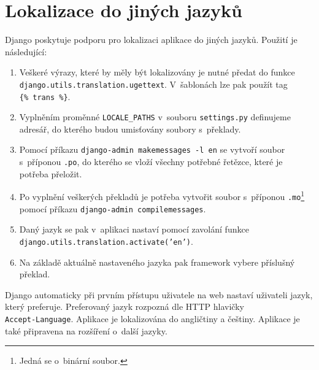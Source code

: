 \section{Lokalizace do jiných jazyků}
Django poskytuje podporu pro lokalizaci aplikace do jiných jazyků. Použití je následující:
\begin{enumerate}
    \item Veškeré výrazy, které by měly být lokalizovány je nutné předat do funkce \\\texttt{django.utils.translation.ugettext}. V~šablonách lze pak použít tag \\\mbox{\texttt{\{\% trans \%\}}}.
    \item Vyplněním proměnné \texttt{LOCALE\_PATHS} v~souboru \texttt{settings.py} definujeme adresář, do kterého budou umisťovány soubory s~překlady.
    \item Pomocí příkazu \texttt{django-admin makemessages -l en} se vytvoří soubor s~příponou \texttt{.po}, do kterého se vloží všechny potřebné řetězce, které je potřeba přeložit.
    \item Po vyplnění veškerých překladů je potřeba vytvořit soubor s~příponou \texttt{.mo}\footnote{Jedná se o~binární soubor.} pomocí příkazu \texttt{django-admin compilemessages}.
    \item Daný jazyk se pak v~aplikaci nastaví pomocí zavolání funkce \\\texttt{django.utils.translation.activate('en')}.
    \item Na základě aktuálně nastaveného jazyka pak framework vybere příslušný překlad.
\end{enumerate}

Django automaticky při prvním přístupu uživatele na web nastaví uživateli jazyk, který preferuje. Preferovaný jazyk rozpozná dle HTTP hlavičky \\\texttt{Accept-Language}. Aplikace je lokalizována do angličtiny a češtiny. Aplikace je také připravena na rozšíření o~další jazyky.